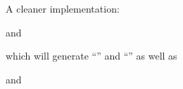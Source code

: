 \documentclass[AEJ]{AEA}
\newcommand{\citet}{\textcite}
\begin{document}
A cleaner implementation: 

and

which will generate ``\citet{duflopande2006-new}'' and ``\citet{leiss1999-new}'' as well as
%
\begin{quote}
\end{quote}
%
and
%
\begin{quote}
\end{quote}
%
\newpage
%
%

\printbibliography[title={References}]
\end{document}
